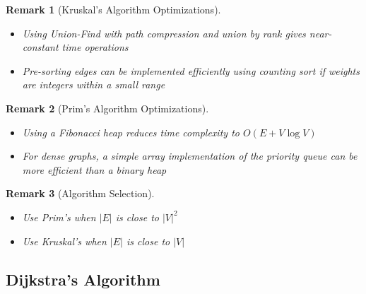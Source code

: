 \documentclass{article}
\newtheorem{remark}{Remark}
\theoremstyle{definition}
\begin{document}
\begin{remark}[Kruskal's Algorithm Optimizations]
\begin{itemize}
    \item Using Union-Find with path compression and union by rank gives near-constant time operations
    \item Pre-sorting edges can be implemented efficiently using counting sort if weights are integers within a small range
\end{itemize}
\end{remark}

\begin{remark}[Prim's Algorithm Optimizations]
\begin{itemize}
    \item Using a Fibonacci heap reduces time complexity to $O(E + V \log V)$
    \item For dense graphs, a simple array implementation of the priority queue can be more efficient than a binary heap
\end{itemize}
\end{remark}

\begin{remark}[Algorithm Selection]
\begin{itemize}
    \item Use Prim's when $|E|$ is close to $|V|^2$
    \item Use Kruskal's when $|E|$ is close to $|V|$
\end{itemize}
\end{remark}


\pagebreak

\subsection{Dijkstra's Algorithm}
\end{document}
